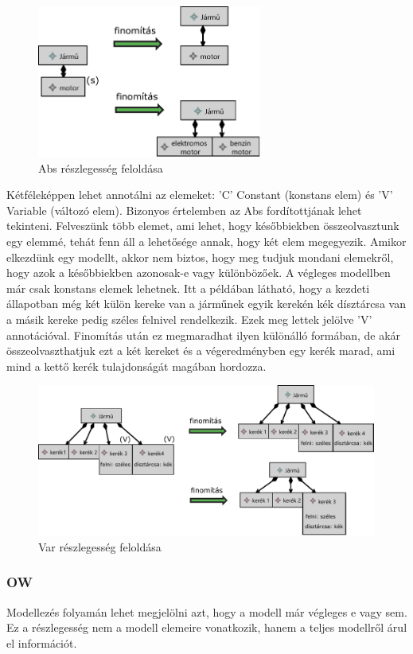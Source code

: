 \begin{figure}[htp]
	\centering
	\includegraphics[height=50mm, keepaspectratio]{figures/abs.pdf}
	\caption{Abs részlegesség feloldása} 
\end{figure}


Kétféleképpen lehet annotálni az elemeket: ’C’ Constant (konstans elem) és ’V’ Variable (változó elem). Bizonyos értelemben az Abs fordítottjának lehet tekinteni. Felveszünk több elemet, ami lehet, hogy későbbiekben összeolvasztunk egy elemmé, tehát fenn áll a lehetősége annak, hogy két elem megegyezik. Amikor elkezdünk egy modellt, akkor nem biztos, hogy meg tudjuk mondani elemekről, hogy azok a későbbiekben azonosak-e vagy különbözőek. A végleges modellben már csak konstans elemek lehetnek.
Itt a példában látható, hogy a kezdeti állapotban még két külön kereke van a járműnek egyik kerekén kék dísztárcsa van a másik kereke pedig széles felnivel rendelkezik. Ezek meg lettek jelölve 'V' annotációval. Finomítás után ez megmaradhat ilyen különálló formában, de akár összeolvaszthatjuk ezt a két kereket és a végeredményben egy kerék marad, ami mind a kettő kerék tulajdonságát magában hordozza.

\begin{figure}[htp]
	\centering
	\includegraphics[height=50mm, keepaspectratio]{figures/var.pdf}
	\caption{Var részlegesség feloldása} 
\end{figure}

\subsubsection{OW}
Modellezés folyamán lehet megjelölni azt, hogy a modell már végleges e vagy sem. Ez a részlegesség nem a modell elemeire vonatkozik, hanem a teljes modellről árul el információt. 

